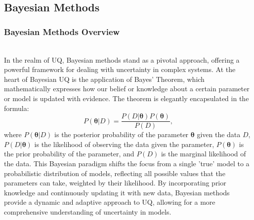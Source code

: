 \subsection{Bayesian Methods}
\subsubsection{Bayesian Methods Overview}\hfill\\
In the realm of UQ, Bayesian methods stand as a pivotal approach, offering a powerful framework for dealing with uncertainty in complex systems. 
At the heart of Bayesian UQ is the application of Bayes' Theorem, which mathematically expresses how our belief or knowledge about a certain parameter or model is updated with evidence. 
The theorem is elegantly encapsulated in the formula: 
\begin{equation}
    \label{eq:Bayes_Theorem}
    P(\boldsymbol{\theta}|D)=\frac{P(D|\boldsymbol{\theta})P(\boldsymbol{\theta})}{P(D)},
\end{equation}
where $P(\boldsymbol{\theta}|D)$ is the posterior probability of the parameter $\boldsymbol{\theta}$ given the data $D$, $P(D|\boldsymbol{\theta})$ is the likelihood of observing the data given the parameter, $P(\boldsymbol{\theta})$ is the prior probability of the parameter, and $P(D)$ is the marginal likelihood of the data. 
This Bayesian paradigm shifts the focus from a single 'true' model to a probabilistic distribution of models, reflecting all possible values that the parameters can take, weighted by their likelihood. 
By incorporating prior knowledge and continuously updating it with new data, Bayesian methods provide a dynamic and adaptive approach to UQ, allowing for a more comprehensive understanding of uncertainty in models.


